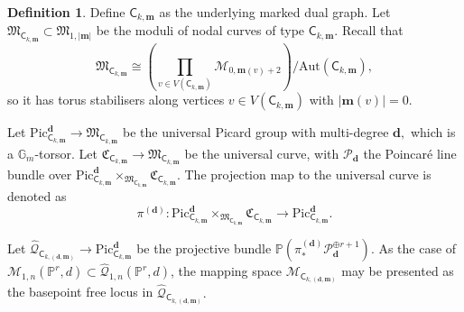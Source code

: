 \documentclass[12pt,reqno]{amsart}
\theoremstyle{definition}
\theoremstyle{definition}
\theoremstyle{definition}
\theoremstyle{definition}
\newtheorem{definition}[theorem]{Definition}
\newcommand{\PP}{\mathbb{P}}
\begin{document}
\begin{definition}
  Define $\mathsf{C}_{k, \mathbf{m}}$ as the underlying marked dual graph. Let $\mathfrak{M}_{\mathsf{C}_{k, \mathbf{m}}}\subset \mathfrak{M}_{1, |\mathbf{m}|}$ be the moduli of nodal curves of type $\mathsf{C}_{k, \mathbf{m}}$.  Recall that $$\mathfrak{M}_{\mathsf{C}_{k, \mathbf{m}}}\cong \left(\prod_{v\in V(\mathsf{C}_{k, \mathbf{m}})}\mathcal{M}_{0, \mathbf{m}(v)+2}\right)/\mathrm{Aut}(\mathsf{C}_{k, \mathbf{m}}),$$ so it has torus stabilisers along vertices $v\in V(\mathsf{C}_{k, \mathbf{m}})$ with $|\mathbf{m}(v)| = 0.$
  
  Let $\mathrm{Pic}^{\mathbf{d}}_{\mathsf{C}_{k, \mathbf{m}}}\to \mathfrak{M}_{\mathsf{C}_{k, \mathbf{m}}}$ be the universal Picard group with multi-degree $\mathbf{d},$ which is a $\mathbb{G}_m$-torsor. Let $\mathfrak{C}_{\mathsf{C}_{k, \mathbf{m}}}\to \mathfrak{M}_{\mathsf{C}_{k, \mathbf{m}}}$ be the universal curve, with $\mathcal{P}_{\mathbf{d}}$ the Poincaré line bundle over $\mathrm{Pic}^{\mathbf{d}}_{\mathsf{C}_{k, \mathbf{m}}}\times_{\mathfrak{M}_{\mathsf{C}_{k, \mathbf{m}}}} \mathfrak{C}_{\mathsf{C}_{k, \mathbf{m}}}.$ The projection map to the universal curve is denoted as $$\pi^{(\mathbf{d})}: \mathrm{Pic}^{\mathbf{d}}_{\mathsf{C}_{k, \mathbf{m}}}\times_{\mathfrak{M}_{\mathsf{C}_{k, \mathbf{m}}}} \mathfrak{C}_{\mathsf{C}_{k, \mathbf{m}}}\to \mathrm{Pic}^{\mathbf{d}}_{\mathsf{C}_{k, \mathbf{m}}}.$$ 
  
  Let $\hat{\mathcal{Q}}_{\mathsf{C}_{k, (\mathbf{d}, \mathbf{m})}}\to \mathrm{Pic}^{\mathbf{d}}_{\mathsf{C}_{k, \mathbf{m}}}$ be the projective bundle $\mathbb{P}(\pi^{(\mathbf{d})}_* \mathcal{P}_{\mathbf{d}}^{\oplus r+1}).$ As the case of $\mathcal{M}_{1,n}(\PP^r,d)\subset \hat{\mathcal{Q}}_{1,n}(\PP^r,d)$, the mapping space $\mathcal{M}_{\mathsf{C}_{k, (\mathbf{d}, \mathbf{m})}}$ may be presented as the basepoint free locus in $\hat{\mathcal{Q}}_{\mathsf{C}_{k, (\mathbf{d}, \mathbf{m})}}.$
\end{definition}
\end{document}
